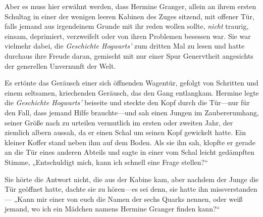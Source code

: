 Aber es muss hier erwähnt werden, dass Hermine Granger, allein an ihrem ersten Schultag in einer der wenigen leeren Kabinen des Zuges sitzend, mit offener Tür, falls jemand aus irgendeinem Grunde mit ihr reden wollen sollte, \emph{nicht} traurig, einsam, deprimiert, verzweifelt oder von ihren Problemen besessen war. Sie war vielmehr dabei, die \emph{Geschichte Hogwarts’} zum dritten Mal zu lesen und hatte durchaus ihre Freude daran, gemischt mit nur einer Spur Genervtheit angesichts der generellen Unvernunft der Welt.

Es ertönte das Geräusch einer sich öffnenden Wagentür, gefolgt von Schritten und einem seltsamen, kriechenden Geräusch, das den Gang entlangkam. Hermine legte die \emph{Geschichte Hogwarts’} beiseite und steckte den Kopf durch die Tür—nur für den Fall, dass jemand Hilfe brauchte—und sah einen Jungen im Zaubererumhang, seiner Größe nach zu urteilen vermutlich im ersten oder zweiten Jahr, der ziemlich albern aussah, da er einen Schal um seinen Kopf gewickelt hatte. Ein kleiner Koffer stand neben ihm auf dem Boden. Als sie ihn sah, klopfte er gerade an die Tür eines anderen Abteils und sagte in einer vom Schal leicht gedämpften Stimme, „Entschuldigt mich, kann ich schnell eine Frage stellen?“

Sie hörte die Antwort nicht, die aus der Kabine kam, aber nachdem der Junge die Tür geöffnet hatte, dachte sie zu hören—es sei denn, sie hatte ihn missverstanden— „Kann mir einer von euch die Namen der sechs Quarks nennen, oder weiß jemand, wo ich ein Mädchen namens Hermine Granger finden kann?“

